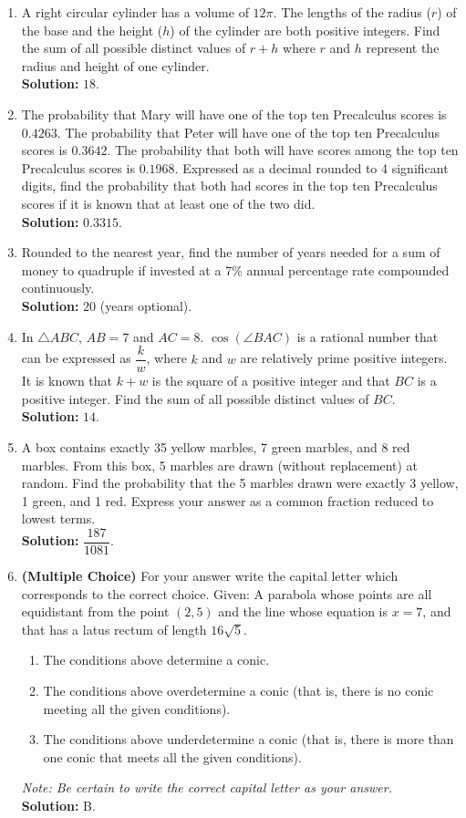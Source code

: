 \documentclass[10pt]{article}
\begin{document}
\begin{enumerate}
\item A right circular cylinder has a volume of $12\pi$. The lengths of the radius ($r$) of the base and the height ($h$) of the cylinder are both positive integers. Find the sum of all possible distinct values of $r+h$ where $r$ and $h$ represent the radius and height of one cylinder.\\
\textbf{Solution:} $18$.

\item The probability that Mary will have one of the top ten Precalculus scores is $0.4263$. The probability that Peter will have one of the top ten Precalculus scores is $0.3642$. The probability that both will have scores among the top ten Precalculus scores is $0.1968$. Expressed as a decimal rounded to 4 significant digits, find the probability that both had scores in the top ten Precalculus scores if it is known that at least one of the two did.\\
\textbf{Solution:} $0.3315$.

\item Rounded to the nearest year, find the number of years needed for a sum of money to quadruple if invested at a 7\% annual percentage rate compounded continuously.\\
\textbf{Solution:} $20$ (years optional).

\item In $\triangle ABC$, $AB=7$ and $AC=8$. $\cos(\angle BAC)$ is a rational number that can be expressed as $\dfrac{k}{w}$, where $k$ and $w$ are relatively prime positive integers. It is known that $k+w$ is the square of a positive integer and that $BC$ is a positive integer. Find the sum of all possible distinct values of $BC$.\\
\textbf{Solution:} $14$.

\item A box contains exactly 35 yellow marbles, 7 green marbles, and 8 red marbles. From this box, 5 marbles are drawn (without replacement) at random. Find the probability that the 5 marbles drawn were exactly 3 yellow, 1 green, and 1 red. Express your answer as a common fraction reduced to lowest terms.\\
\textbf{Solution:} $\dfrac{187}{1081}$.

\item \textbf{(Multiple Choice)} For your answer write the capital letter which corresponds to the correct choice. Given: A parabola whose points are all equidistant from the point $(2,5)$ and the line whose equation is $x=7$, and that has a latus rectum of length $16\sqrt5$.
\begin{enumerate}
\item[A)] The conditions above determine a conic.
\item[B)] The conditions above overdetermine a conic (that is, there is no conic meeting all the given conditions).
\item[C)] The conditions above underdetermine a conic (that is, there is more than one conic that meets all the given conditions).
\end{enumerate}
\textit{Note: Be certain to write the correct capital letter as your answer.}\\
\textbf{Solution:} B.


\end{enumerate}
\end{document}
